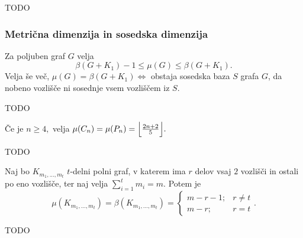 \documentclass[mat1, tisk]{fmfdelo}
\newcommand{\1}{(1, 1, ..., 1)}
\newcommand{\2}{(2, 2, ..., 2)}
\begin{document}
\begin{dokaz}
    TODO
\end{dokaz}



\subsubsection{Metrična dimenzija in sosedska dimenzija}

\begin{trditev}
    Za poljuben graf $G$ velja
    $$\beta(G + K_1) - 1 \leq \mu(G) \leq \beta(G + K_1).$$
    Velja še več, 
    $\mu(G) = \beta(G + K_1) \Leftrightarrow$ obstaja sosedska baza $S$ grafa $G$, 
    da nobeno vozlišče ni sosednje vsem vozliščem iz $S$.
\end{trditev}

\begin{dokaz}
    TODO
\end{dokaz}


\begin{trditev}
    Če je $n \geq 4,$ velja $\mu(C_n) = \mu(P_n) = \Bigl \lfloor \frac{2n + 2}{5}\Bigr \rfloor. $
\end{trditev}

\begin{dokaz}
    TODO
\end{dokaz}


\begin{trditev}
    Naj bo $K_{m_1, ..., m_t}$ $t$-delni polni graf, v katerem ima $r$ delov vsaj $2$ vozlišči in ostali 
    po eno vozlišče, ter naj velja $\sum_{i=1}^{t} m_i = m.$ Potem je
    $$\mu(K_{m_1, ..., m_t}) = \beta(K_{m_1, ..., m_t}) = 
    \begin{cases}
        m - r - 1; & r \neq t \\
        m - r; & r = t 
    \end{cases}.$$
\end{trditev}

\begin{dokaz}
    TODO
\end{dokaz}



\end{document}
